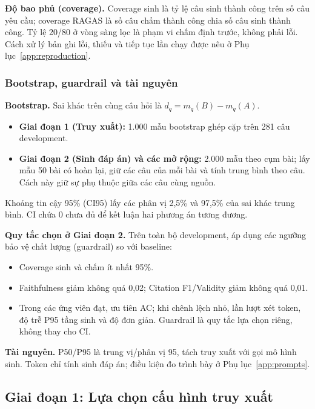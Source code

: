 \textbf{Độ bao phủ (coverage).} Coverage sinh là tỷ lệ câu sinh thành công trên số câu yêu cầu; coverage RAGAS là số câu chấm thành công chia số câu sinh thành công. Tỷ lệ 20/80 ở vòng sàng lọc là phạm vi chấm định trước, không phải lỗi. Cách xử lý bản ghi lỗi, thiếu và tiếp tục lần chạy được nêu ở Phụ lục~\ref{app:reproduction}.
\subsubsection{Bootstrap, guardrail và tài nguyên}
\textbf{Bootstrap.} Sai khác trên cùng câu hỏi là $d_q=m_q(B)-m_q(A)$.
\begin{itemize}
\item \textbf{Giai đoạn 1 (Truy xuất):} 1.000 mẫu bootstrap ghép cặp trên 281 câu development.
\item \textbf{Giai đoạn 2 (Sinh đáp án) và các mở rộng:} 2.000 mẫu theo cụm bài; lấy mẫu 50 bài có hoàn lại, giữ các câu của mỗi bài và tính trung bình theo câu. Cách này giữ sự phụ thuộc giữa các câu cùng nguồn.
\end{itemize}
Khoảng tin cậy 95\% (CI95) lấy các phân vị 2,5\% và 97,5\% của sai khác trung bình. CI chứa 0 chưa đủ để kết luận hai phương án tương đương.

\textbf{Quy tắc chọn ở Giai đoạn 2.} Trên toàn bộ development, áp dụng các ngưỡng bảo vệ chất lượng (guardrail) so với baseline:
\begin{itemize}
\item Coverage sinh và chấm ít nhất 95\%.
\item Faithfulness giảm không quá 0,02; Citation F1/Validity giảm không quá 0,01.
\item Trong các ứng viên đạt, ưu tiên AC; khi chênh lệch nhỏ, lần lượt xét token, độ trễ P95 tầng sinh và độ đơn giản. Guardrail là quy tắc lựa chọn riêng, không thay cho CI.
\end{itemize}

\textbf{Tài nguyên.} P50/P95 là trung vị/phân vị 95, tách truy xuất với gọi mô hình sinh. Token chỉ tính sinh đáp án; điều kiện đo trình bày ở Phụ lục~\ref{app:prompts}.

\FloatBarrier
\subsection{Giai đoạn 1: Lựa chọn cấu hình truy xuất}

